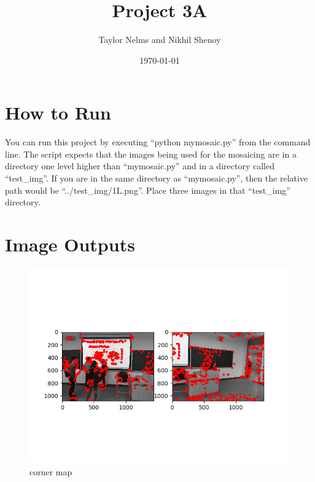 \documentclass[10pt]{article}
\begin{document}
\title{\vspace{-2.0cm}Project 3A}
\author{Taylor Nelms and Nikhil Shenoy}
\date{\today}

\maketitle

\section{How to Run}
You can run this project by executing ``python mymosaic.py'' from the command line. The script expects that the images being used for the mosaicing are in a directory one level higher than ``mymosaic.py'' and in a directory called ``test\_img''. If you are in the same directory as ``mymosaic.py'', then the relative path would be ``../test\_img/1L.png''. Place three images in that ``test\_img'' directory.

\section{Image Outputs}

	\begin{figure}[h]
		\caption{corner map}
		\centering
		\includegraphics{ANMSl2m.png}
	\end{figure}
\end{document}
